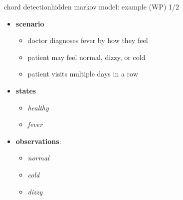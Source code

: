         \begin{frame}{chord detection}{hidden markov model: example (WP) 1/2}
            \begin{itemize}
                \item   \textbf{scenario}
                    \begin{itemize}
                        \item   doctor diagnoses fever by how they feel
                        \item   patient may feel normal, dizzy, or cold
                        \item   patient visits multiple days in a row 
                    \end{itemize}
            \end{itemize}
            
            \begin{itemize}
                \item	\textbf{states} %
                    \begin{itemize}
                        \item   \textit{healthy}
                        \item   \textit{fever}
                    \end{itemize}
                \item   \textbf{observations}: %
                    \begin{itemize}
                        \item   \textit{normal}
                        \item   \textit{cold}
                        \item   \textit{dizzy}
                    \end{itemize}
            \end{itemize}
        \end{frame}
